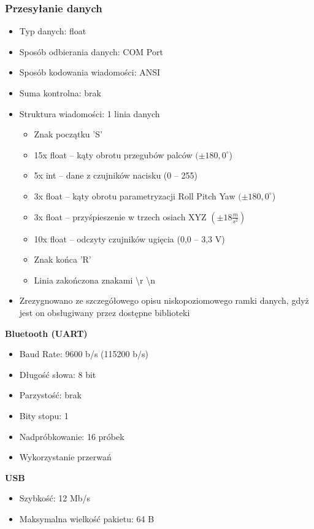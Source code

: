 \documentclass[12pt,a4paper]{article}
\begin{document}
\subsubsection{Przesyłanie danych}
\begin{itemize}
\item Typ danych: float
\item Sposób odbierania danych: COM Port
\item Sposób kodowania wiadomości: ANSI
\item Suma kontrolna: brak
\item Struktura wiadomości: 1 linia danych
\begin{itemize}
\item Znak początku 'S'
\item 15x float -- kąty obrotu przegubów palców $(\pm 180,0 ^\circ$)
\item 5x int -- dane z czujników nacisku (0 -- 255)
\item 3x float -- kąty obrotu parametryzacji Roll Pitch Yaw $(\pm 180,0^\circ$)
\item 3x float -- przyśpieszenie w trzech osiach XYZ $(\pm 18 \frac{m}{s^2})$
\item 10x float -- odczyty czujników ugięcia (0,0 -- 3,3 V)
\item Znak końca 'R'
\item Linia zakończona znakami \textbackslash r \textbackslash n
\end{itemize}
\item Zrezygnowano ze szczegółowego opisu niskopoziomowego ramki danych, gdyż jest on obsługiwany przez dostępne biblioteki
\end{itemize}
\textbf{Bluetooth (UART)}
\begin{itemize}
\item Baud Rate: 9600 b/s (115200 b/s)
\item Długość słowa: 8 bit
\item Parzystość: brak
\item Bity stopu: 1
\item Nadpróbkowanie: 16 próbek
\item Wykorzystanie przerwań
\end{itemize}
\textbf{USB}
\begin{itemize}
\item Szybkość: 12 Mb/s
\item Maksymalna wielkość pakietu: 64 B
\end{itemize}
\end{document}
